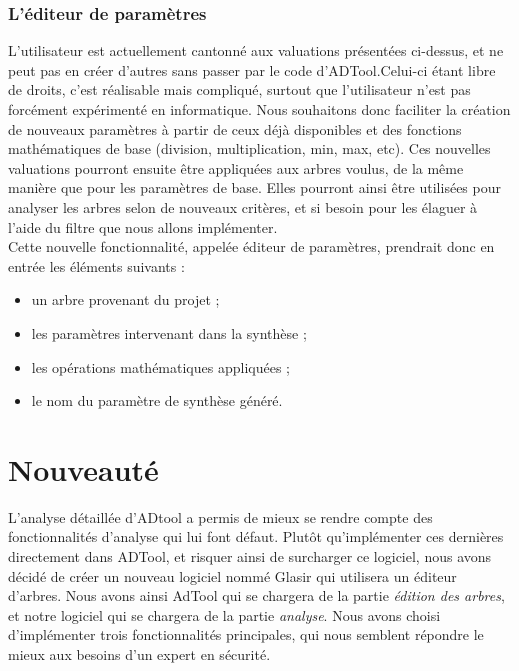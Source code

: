 \subsubsection{L'éditeur de paramètres}

L'utilisateur est actuellement cantonné aux valuations présentées ci-dessus, et ne peut pas en créer d'autres sans passer par le code d'ADTool.Celui-ci étant libre de droits, c'est réalisable mais compliqué, surtout que l'utilisateur n'est pas forcément expérimenté en informatique. %
Nous souhaitons donc faciliter la création de nouveaux paramètres à partir de ceux déjà disponibles et des fonctions mathématiques de base (division, multiplication, min, max, etc). Ces nouvelles valuations pourront ensuite être appliquées aux arbres voulus, de la même manière que pour les paramètres de base. Elles pourront ainsi être utilisées pour analyser les arbres selon de nouveaux critères, et si besoin pour les élaguer à l'aide du filtre que nous allons implémenter.\\

Cette nouvelle fonctionnalité, appelée éditeur de paramètres, prendrait donc en entrée les éléments suivants :
\begin{itemize}[label=,font=\color{magenta},parsep=0cm,itemsep=0cm, leftmargin=0cm]
\item un arbre provenant du projet ;
\item les paramètres intervenant dans la synthèse ;
\item les opérations mathématiques appliquées ;
\item le nom du paramètre de synthèse généré.
\end{itemize}

\section{Nouveauté}
	
	L'analyse détaillée d'ADtool a permis de mieux se rendre compte des fonctionnalités d'analyse qui lui font défaut. Plutôt qu'implémenter ces dernières directement dans ADTool, et risquer ainsi de surcharger ce logiciel, nous avons décidé de créer un nouveau logiciel nommé Glasir qui utilisera un éditeur d'arbres. Nous avons ainsi AdTool qui se chargera de la partie \textit{édition des arbres}, et notre logiciel qui se chargera de la partie \textit{analyse}. Nous avons choisi d'implémenter trois fonctionnalités principales, qui nous semblent répondre le mieux aux besoins d'un expert en sécurité.

